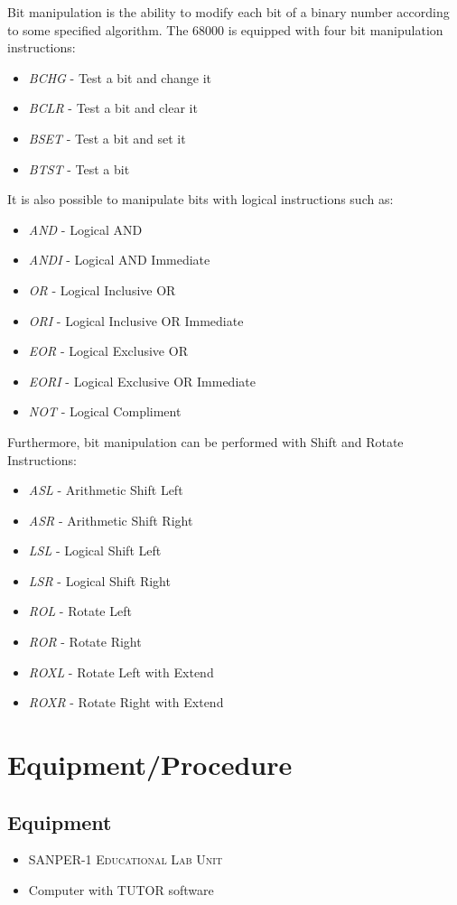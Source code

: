 \documentclass[12pt, twocolumn]{article}
\begin{document}
Bit manipulation is the ability to modify each bit of a binary number according to some specified algorithm. The 68000 is equipped with four bit manipulation instructions:
\begin{itemize}
	\item \textit{BCHG} - Test a bit and change it
	\item \textit{BCLR} - Test a bit and clear it
	\item \textit{BSET} - Test a bit and set it
	\item \textit{BTST} - Test a bit 
\end{itemize}
It is also possible to manipulate bits with logical instructions such as:
\begin{itemize}
	\item \textit{AND} - Logical AND
	\item \textit{ANDI} - Logical AND Immediate
	\item \textit{OR} - Logical Inclusive OR
	\item \textit{ORI} - Logical Inclusive OR Immediate
	\item \textit{EOR} - Logical Exclusive OR
	\item \textit{EORI} - Logical Exclusive OR Immediate
	\item \textit{NOT} - Logical Compliment
\end{itemize}
Furthermore, bit manipulation can be performed with Shift and Rotate Instructions:
\begin{itemize}
	\item \textit{ASL} - Arithmetic Shift Left
	\item \textit{ASR} - Arithmetic Shift Right
	\item \textit{LSL} - Logical Shift Left
	\item \textit{LSR} - Logical Shift Right
	\item \textit{ROL} - Rotate Left
	\item \textit{ROR} - Rotate Right
	\item \textit{ROXL} - Rotate Left with Extend
	\item \textit{ROXR} - Rotate Right with Extend

\end{itemize}
\section{Equipment/Procedure}
\subsection{Equipment}
\begin{itemize}
	\item \textsc{SANPER-1 Educational Lab Unit}
	\item Computer with TUTOR software
\end{itemize}
\end{document}

